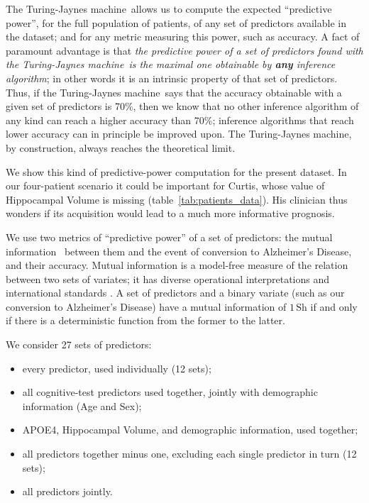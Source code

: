 \documentclass[utf8]{FrontiersinHarvard} %
\renewcommand*{\|}[1][]{\nonscript\:#1\vert\nonscript\:\mathopen{}}
\newcommand*{\ad}{Alzheimer's Disease}
\newcommand*{\tjm}{Turing-Jaynes machine}
\begin{document}
The \tjm\ allows us to compute the expected \enquote{predictive power}, for the full population of patients, of any set of predictors available in the dataset; and for any metric measuring this power, such as accuracy. A fact of paramount advantage is that \emph{the predictive power of a set of predictors found with the \tjm\ is the maximal one obtainable by \textbf{any} inference algorithm}; in other words it is an intrinsic property of that set of predictors. Thus, if the \tjm\ says that the accuracy obtainable with a given set of predictors is 70\%, then we know that no other inference algorithm of any kind can reach a higher accuracy than 70\%; inference algorithms that reach lower accuracy can in principle be improved upon. The \tjm, by construction, always reaches the theoretical limit.

We show this kind of predictive-power computation for the present dataset. In our four-patient scenario it could be important for Curtis, whose value of Hippocampal Volume is missing (table~\ref{tab:patients_data}). His clinician thus wonders if its acquisition would lead to a much more informative prognosis.

We use two metrics of \enquote{predictive power} of a set of predictors: the mutual information~\citep{shannon1948,coveretal1991_r2006} between them and the event of conversion to \ad, and their accuracy. Mutual information is a model-free measure of the relation between two sets of variates; it has diverse operational interpretations \citep{mackay1995_r2005,woodward1953_r1964,minka1998d_r2003,goodetal1968,kelly1956,kullback1959_r1978} and international standards \citep{iso2008c}. A set of predictors and a binary variate (such as our conversion to \ad) have a mutual information of $1\,\mathrm{Sh}$ if and only if there is a deterministic function from the former to the latter.

We consider 27 sets of predictors:
\begin{itemize}
\item every predictor, used individually (12 sets);
\item all cognitive-test predictors used together, jointly with demographic information (Age and Sex);
\item APOE4, Hippocampal Volume, and demographic information, used together;
\item all predictors together minus one, excluding each single predictor in turn (12 sets);
\item all predictors jointly.
\end{itemize}
\end{document}
